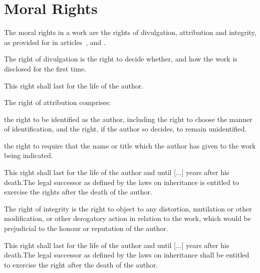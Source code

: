 \section{Moral Rights}
\begin{contract}
\label{Par:MoralRightsGeneral}
\Sentence The moral rights in a work are the rights of divulgation, attribution and
integrity, as provided for in articles~,  and .

\label{Par:RightOfDivulgation}
\Sentence The right of divulgation is the right to decide whether, and how the work is disclosed for the first time.

\Sentence This right shall last for the life of the author.

\label{Par:RightOfAttribution}
\Sentence  The right of attribution comprises:
\begin{legalenum}
	\item the right to be identified as the author, including the right to choose
				the manner of identification, and the right, if the author so decides,
				to remain unidentified.
	\item the right to require that the name or title which the author has given to
				the work being indicated.
\end{legalenum}

\Sentence This right shall last for the life of the author and until [...] years after his
death.\Sentence The legal successor as defined by the laws on inheritance is
entitled to exercise the rights after the death of the author.

\label{Par:RightOfIntegrity}
\Sentence  The right of integrity is the right to object to any distortion, mutilation
or other modification, or other derogatory action in relation to the work,
which would be prejudicial to the honour or reputation of the author.

\Sentence This right shall last for the life of the author and until [...] years after his
death.\Sentence The legal successor as defined by the laws on inheritance shall be
entitled to exercise the right after the death of the author.


\end{contract}
